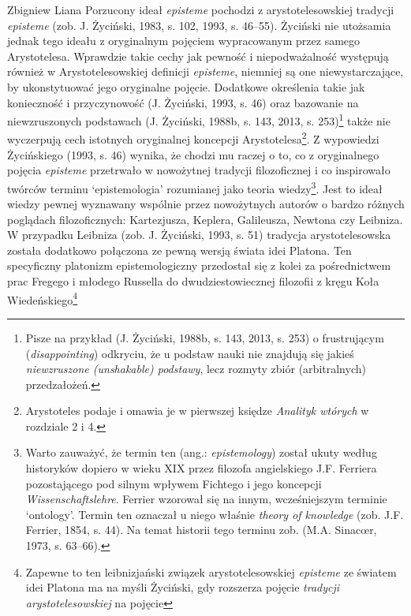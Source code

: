 \begin{artplenv}{Zbigniew Liana}
Porzucony ideał \textit{episteme} pochodzi z arystotelesowskiej tradycji \textit{episteme} \label{ref:RNDRmhyRD3ZvW}(zob. J.
Życiński, 1983, s. 102, 1993, s. 46–55). Życiński nie utożsamia jednak tego ideału z oryginalnym pojęciem wypracowanym
przez samego Arystotelesa. Wprawdzie takie cechy jak pewność i niepodważalność występują również w Arystotelesowskiej
definicji \textit{episteme}, niemniej są one niewystarczające, by ukonstytuować jego oryginalne pojęcie. Dodatkowe
określenia takie jak konieczność i przyczynowość \label{ref:RNDUffssKrdla}(J. Życiński, 1993, s. 46) oraz bazowanie na
niewzruszonych podstawach \label{ref:RNDxd5cHMOpD0}(J. Życiński, 1988b, s. 143, 2013, s. 253)\footnote{Pisze na
przykład \label{ref:RNDydmrxn78a6}(J. Życiński, 1988b, s. 143, 2013, s. 253) o frustrującym (\textit{disappointing})
odkryciu, że u podstaw nauki nie znajdują się jakieś \textit{niewzruszone (unshakable) podstawy}, lecz rozmyty zbiór
(arbitralnych) przedzałożeń.} także nie wyczerpują cech istotnych oryginalnej koncepcji
Arystotelesa\footnote{Arystoteles podaje i omawia je w pierwszej księdze \textit{Analityk wtórych} w rozdziale 2 i 4.}. Z
wypowiedzi Życińskiego \label{ref:RNDawumYBBRbe}(1993, s. 46) wynika, że chodzi mu raczej o to, co z oryginalnego
pojęcia \textit{episteme} przetrwało w nowożytnej tradycji filozoficznej i co inspirowało twórców terminu `epistemologia'
rozumianej jako teoria wiedzy\footnote{Warto zauważyć, że termin ten (ang.: \textit{epistemology}) został ukuty według
historyków dopiero w wieku XIX przez filozofa angielskiego J.F. Ferriera pozostającego pod silnym wpływem Fichtego i jego
koncepcji \textit{Wissenschaftslehre}. Ferrier wzorował się na innym, wcześniejszym terminie `ontology'. Termin ten
oznaczał u niego właśnie \textit{theory of knowledge} \label{ref:RNDLNW5r1yicU}(zob. J.F. Ferrier, 1854, s. 44). Na temat
historii tego terminu zob. \label{ref:RNDfrxMechpbI}(M.A. Sinacœr, 1973, s. 63–66).}. Jest to ideał wiedzy pewnej
wyznawany wspólnie przez nowożytnych autorów o bardzo różnych poglądach filozoficznych: Kartezjusza, Keplera,
Galileusza, Newtona czy Leibniza. W przypadku Leibniza \label{ref:RNDgl3cIrrlVL}(zob. J. Życiński, 1993, s. 51)
tradycja arystotelesowska została dodatkowo połączona ze pewną wersją świata idei Platona. Ten specyficzny platonizm
epistemologiczny przedostał się z kolei za pośrednictwem prac Fregego i młodego Russella do dwudziestowiecznej
filozofii z kręgu Koła Wiedeńskiego\footnote{Zapewne to ten leibnizjański związek arystotelesowskiej \textit{episteme} ze
światem idei Platona ma na myśli Życiński, gdy rozszerza pojęcie \textit{tradycji arystotelesowskiej} na pojęcie
}
\end{artplenv}
